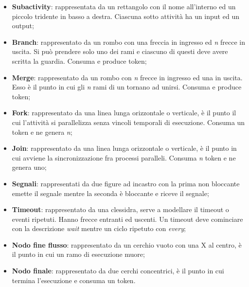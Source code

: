 \begin{itemize}
    \item \textbf{Subactivity}: rappresentata da un rettangolo con il nome all'interno ed un piccolo tridente in basso a destra. Ciascuna sotto attività ha un input ed un output;
    \item \textbf{Branch}: rappresentato da un rombo con una freccia in ingresso ed \textit{n} frecce in uscita. Si può prendere solo uno dei rami e ciascuno di questi deve avere scritta la guardia. Consuma e produce token;
    \item \textbf{Merge}: rappresentato da un rombo con \textit{n} frecce in ingresso ed una in uscita. Esso è il punto in cui gli \textit{n} rami di un  tornano ad unirsi. Consuma e produce token;
    \item \textbf{Fork}: rappresentato da una linea lunga orizzontale o verticale, è il punto il cui l'attività si parallelizza senza vincoli temporali di esecuzione. Consuma un token e ne genera \textit{n};
    \item \textbf{Join}: rappresentato da una linea lunga orizzontale o verticale, è il punto in cui avviene la sincronizzazione fra processi paralleli. Consuma \textit{n} token e ne genera uno;
    \item \textbf{Segnali}: rappresentati da due figure ad incastro con la prima non bloccante emette il segnale mentre la seconda è bloccante e riceve il segnale;
    \item \textbf{Timeout}: rappresentato da una clessidra, serve a modellare il timeout o eventi ripetuti. Hanno frecce entranti ed uscenti. Un timeout deve cominciare con la descrizione \textit{wait} mentre un ciclo ripetuto con \textit{every};
    \item \textbf{Nodo fine flusso}: rappresentato da un cerchio vuoto con una X al centro, è il punto in cui un ramo di esecuzione muore;
    \item \textbf{Nodo finale}: rappresentato da due cerchi concentrici, è il punto in cui termina l'esecuzione e consuma un token.
\end{itemize}
